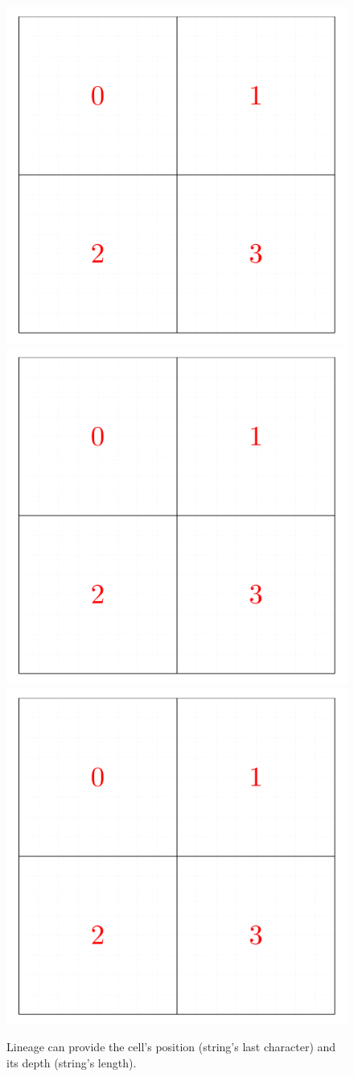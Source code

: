 \begin{figure}[!ht]
    \includegraphics[page=1,width=0.32\linewidth]{figures/cellinpolygon/lineage}
    \includegraphics[page=2,width=0.32\linewidth]{figures/cellinpolygon/lineage}
    \includegraphics[page=3,width=0.32\linewidth]{figures/cellinpolygon/lineage}
    \caption{Lineage can provide the cell's position (string's last character) and its depth (string's length).}
    \label{fig:lineage_example}
\end{figure}
